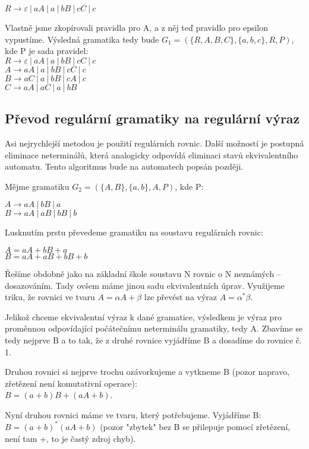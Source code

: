 \documentclass{article}
\begin{document}
$R \rightarrow \varepsilon ~ | ~aA ~ | ~a~ | ~bB~ | ~cC~ | ~c~$

Vlastně jsme zkopírovali pravidla pro A, a z něj teď pravidlo pro epsilon vypustíme. Výsledná gramatika tedy bude 
$G_1 = (\{R,A,B,C\}, \{a,b,c\}, R, P)$, kde P je sada pravidel:\\
$R \rightarrow \varepsilon ~ | ~aA ~ | ~a~ | ~bB~ | ~cC~ | ~c~$\\
$A \rightarrow aA ~ | ~a~ | ~bB~ | ~cC~ | ~c~$\\
$B \rightarrow aC ~ | ~a~ | ~bB~ | ~cA~ | ~c$\\
$C \rightarrow aA~ | ~aC~ |~a~ | ~ bB $

\subsection{Převod regulární gramatiky na regulární výraz}

Asi nejrychlejší metodou je použití regulárních rovnic. Další možností je postupná eliminace neterminálů, která analogicky odpovídá eliminaci stavů ekvivalentního automatu. Tento algoritmus bude na automatech popsán později.

Mějme gramatiku $G_2 = (\{A,B\}, \{a,b\}, A, P)$, kde P:

\noindent
$A \rightarrow aA ~|~ bB ~|~ a$\\
$B \rightarrow aA ~|~ aB ~|~  bB ~|~ b$

Lusknutím prstu převedeme gramatiku na soustavu regulárních rovnic:

\noindent
$A = aA + bB + a$\\
$B = aA + aB + bB + b$

Řešíme obdobně jako na základní škole soustavu N rovnic o N neznámých -- dosazováním.
Tady ovšem máme jinou sadu ekvivalentních úprav. Využijeme triku, že rovnici ve tvaru 
$A = \alpha A + \beta$ lze převést na výraz $A = \alpha ^* \beta$.

Jelikož chceme ekvivalentní výraz k dané gramatice, výsledkem je výraz pro proměnnou odpovídající počátečnímu neterminálu gramatiky, tedy A.
Zbavíme se tedy nejprve B a to tak, že z druhé rovnice vyjádříme B a dosadíme do rovnice č. 1.

Druhou rovnici si nejprve trochu ozávorkujeme a vytkneme B (pozor napravo, zřetězení není komutativní operace):\\
$B = (a + b)B + (aA + b)$.

Nyní druhou rovnici máme ve tvaru, který potřebujeme. Vyjádříme B:\\
$B = (a + b)^* (aA + b)$ (pozor "zbytek" bez B se přilepuje pomocí zřetězení, není tam +, to je častý zdroj chyb).
\end{document}
